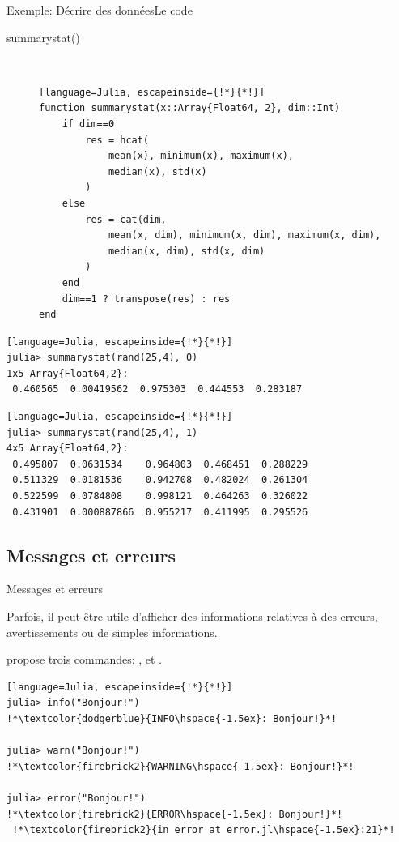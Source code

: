 \begin{frame}[containsverbatim]{\textcolor{goldenrod2}{Exemple:} Décrire des données}{Le code}
\begin{description}
    \item[summarystat()] \ \\ \vspace{-4ex}
\begin{lstlisting}[language=Julia, escapeinside={!*}{*!}]
function summarystat(x::Array{Float64, 2}, dim::Int)
    if dim==0
        res = hcat(
            mean(x), minimum(x), maximum(x),
            median(x), std(x)
        )
    else
        res = cat(dim,
            mean(x, dim), minimum(x, dim), maximum(x, dim),
            median(x, dim), std(x, dim)
        )
    end
    dim==1 ? transpose(res) : res
end
\end{lstlisting}
\end{description}
\vspace{-2ex}
\begin{lstlisting}[language=Julia, escapeinside={!*}{*!}]
julia> summarystat(rand(25,4), 0)
1x5 Array{Float64,2}:
 0.460565  0.00419562  0.975303  0.444553  0.283187
\end{lstlisting}
\vspace{-2ex}
\begin{lstlisting}[language=Julia, escapeinside={!*}{*!}]
julia> summarystat(rand(25,4), 1)
4x5 Array{Float64,2}:
 0.495807  0.0631534    0.964803  0.468451  0.288229
 0.511329  0.0181536    0.942708  0.482024  0.261304
 0.522599  0.0784808    0.998121  0.464263  0.326022
 0.431901  0.000887866  0.955217  0.411995  0.295526
\end{lstlisting}
\end{frame}


\subsection{Messages et erreurs}
\begin{frame}[containsverbatim]{Messages et erreurs}
\par{Parfois, il peut être utile d'afficher des informations relatives à des erreurs, avertissements ou de simples informations.}
\vspace{2ex}
\par{{\Julia} propose trois commandes: ,  et .}
\begin{lstlisting}[language=Julia, escapeinside={!*}{*!}]
julia> info("Bonjour!")
!*\textcolor{dodgerblue}{INFO\hspace{-1.5ex}: Bonjour!}*!

julia> warn("Bonjour!")
!*\textcolor{firebrick2}{WARNING\hspace{-1.5ex}: Bonjour!}*!

julia> error("Bonjour!")
!*\textcolor{firebrick2}{ERROR\hspace{-1.5ex}: Bonjour!}*!
 !*\textcolor{firebrick2}{in error at error.jl\hspace{-1.5ex}:21}*!
\end{lstlisting}
\end{frame}


